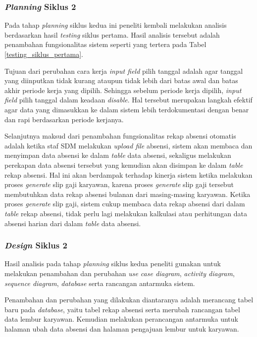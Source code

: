 	\subsubsection{\emph{Planning} Siklus 2}
	Pada tahap \emph{planning} siklus kedua ini peneliti kembali melakukan analisis berdasarkan hasil \emph{testing} siklus pertama. Hasil analisis tersebut adalah penambahan fungsionalitas sistem seperti yang tertera pada Tabel \ref{testing_siklus_pertama}.
	
	Tujuan dari perubahan cara kerja \emph{input field} pilih tanggal adalah agar tanggal yang diinputkan tidak kurang ataupun tidak lebih dari batas awal dan batas akhir periode kerja yang dipilih. Sehingga sebelum periode kerja dipilih, \emph{input field} pilih tanggal dalam keadaan \emph{disable}. Hal tersebut merupakan langkah efektif agar data yang dimasukkan ke dalam sistem lebih terdokumentasi dengan benar dan rapi berdasarkan periode kerjanya.
	
	Selanjutnya maksud dari penambahan fungsionalitas rekap absensi otomatis adalah ketika staf SDM melakukan \emph{upload file} absensi, sistem akan membaca dan menyimpan data absensi ke dalam \emph{table} data absensi, sekaligus melakukan perekapan data absensi tersebut yang kemudian akan disimpan ke dalam \emph{table} rekap absensi. Hal ini akan berdampak terhadap kinerja sistem ketika melakukan proses \emph{generate} slip gaji karyawan, karena proses \emph{generate} slip gaji tersebut membutuhkan data rekap absensi bulanan dari masing-masing karyawan. Ketika proses \emph{generate} slip gaji, sistem cukup membaca data rekap absensi dari dalam \emph{table} rekap absensi, tidak perlu lagi melakukan kalkulasi atau perhitungan data absensi harian
	dari dalam \emph{table} data absensi.
	
	\subsubsection{\emph{Design} Siklus 2}
	Hasil analisis pada tahap \emph{planning} siklus kedua peneliti gunakan untuk melakukan penambahan dan perubahan \emph{use case diagram}, \emph{activity diagram}, \emph{sequence diagram}, \emph{database} serta rancangan antarmuka sistem.
	
	Penambahan dan perubahan yang dilakukan diantaranya adalah merancang tabel baru pada \emph{database}, yaitu tabel rekap absensi serta merubah rancangan tabel data lembur karyawan. Kemudian melakukan perancangan antarmuka untuk halaman ubah data absensi dan halaman pengajuan lembur untuk karyawan.
	
